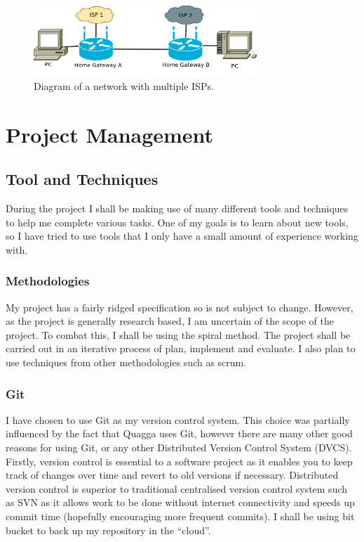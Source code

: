 \documentclass[12pt]{report}
\begin{document}
\begin{figure}
\centering
\includegraphics[width=0.75\textwidth]{../Diagrams/Network/MultipleISP.png}
\caption{Diagram of a network with multiple ISPs.}
\label{fig:ComplexTestNet}
\end{figure}

\chapter{Project Management}

\section{Tool and Techniques}
During the project I shall be making use of many different tools and techniques
to help me complete various tasks. One of my goals is to learn about new tools,
so I have tried to use tools that I only have a small amount of experience
working with. 

\subsection{Methodologies}
My project has a fairly ridged specification so is not subject to change.
However, as the project is generally research based, I am uncertain of the scope
of the project. To combat this, I shall be using the spiral method. The project
shall be carried out in an iterative process of plan, implement and evaluate. I
also plan to use techniques from other methodologies such as scrum. 

\subsection{Git}
I have chosen to use Git as my version control system. This choice was
partially influenced by the fact that Quagga uses Git, however there are many
other good reasons for using Git, or any other Distributed Version Control
System (DVCS). Firstly, version control is essential to a software project as
it enables you to keep track of changes over time and revert to old versions if
necessary. Distributed version control is superior to traditional centralised 
version control system such as SVN as it allows work to be done without internet
connectivity and speeds up commit time (hopefully encouraging more frequent
commits). I shall be using bit bucket to back up my repository in the ``cloud''.
\end{document}
